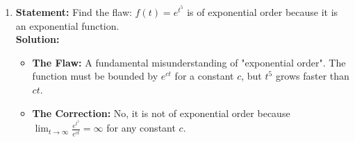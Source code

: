 \documentclass[11pt, letterpaper]{article}
\theoremstyle{definition}
\theoremstyle{remark}
\begin{document}
\begin{enumerate}[label=\textbf{Solution \arabic*.}, leftmargin=*]
    \item \textbf{Statement:} Find the flaw: $f(t) = e^{t^5}$ is of exponential order because it is an exponential function.\\
    \textbf{Solution:}
    \begin{itemize}
        \item \textbf{The Flaw:} A fundamental misunderstanding of "exponential order". The function must be bounded by $e^{ct}$ for a constant $c$, but $t^5$ grows faster than $ct$.
        \item \textbf{The Correction:} No, it is not of exponential order because $\lim_{t \to \infty} \frac{e^{t^5}}{e^{ct}} = \infty$ for any constant $c$.
    \end{itemize}

\end{enumerate}
\end{document}
